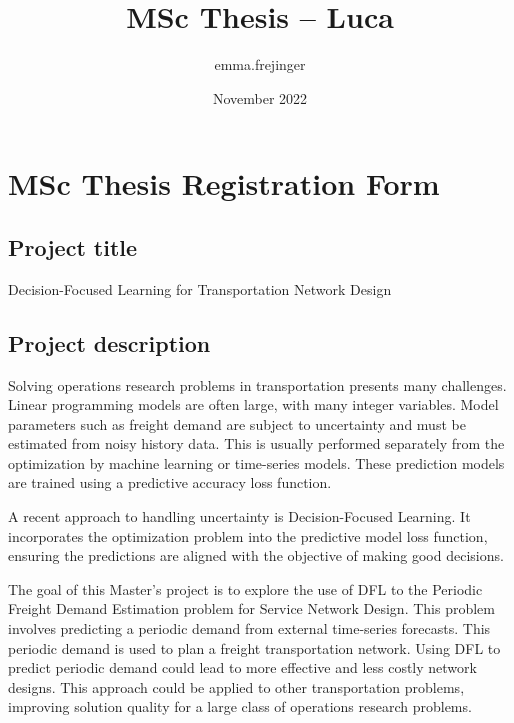 \documentclass{article}
\title{MSc Thesis -- Luca}
\author{emma.frejinger }
\date{November 2022}
\begin{document}
\maketitle

\section{MSc Thesis Registration Form}

\subsection{Project title}

Decision-Focused Learning for Transportation Network Design

\subsection{Project description}

Solving operations research problems in transportation presents many challenges. Linear programming models are often large, with many integer variables. Model parameters such as freight demand are subject to uncertainty and must be estimated from noisy history data. This is usually performed separately from the optimization by machine learning or time-series models. These prediction models are trained using a predictive accuracy loss function.

A recent approach to handling uncertainty is Decision-Focused Learning. It incorporates the optimization problem into the predictive model loss function, ensuring the predictions are aligned with the objective of making good decisions.

The goal of this Master's project is to explore the use of DFL to the Periodic Freight Demand Estimation problem for Service Network Design. This problem involves predicting a periodic demand from external time-series forecasts. This periodic demand is used to plan a freight transportation network. Using DFL to predict periodic demand could lead to more effective and less costly network designs. This approach could be applied to other transportation problems, improving solution quality for a large class of operations research problems.
\end{document}
